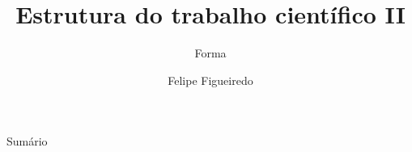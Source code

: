 \documentclass{beamer}
\title%
{Estrutura do trabalho científico II}
\subtitle
{Forma} %
\author%
{Felipe Figueiredo}%
\institute[INTO] %
{Instituto Nacional de Traumatologia e Ortopedia
}
\date%
{}
\begin{document}
\begin{frame}
  \titlepage
\end{frame}

\begin{frame}{Sumário}
  \tableofcontents
\end{frame}








\end{document}
